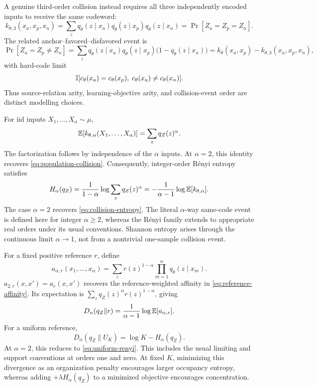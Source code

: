 A genuine third-order collision instead requires all three independently encoded inputs to receive the same codeword:
\begin{equation}
k_{\theta,3}(x_a,x_p,x_n)
=
\sum_z q_\theta(z\mid x_a)q_\theta(z\mid x_p)q_\theta(z\mid x_n)
=
\Pr[Z_a=Z_p=Z_n].
\end{equation}
The related anchor--favored--disfavored event is
\begin{equation}
\Pr[Z_a=Z_p\ne Z_n]
=
\sum_z q_\theta(z\mid x_a)q_\theta(z\mid x_p)
\bigl(1-q_\theta(z\mid x_n)\bigr)
=
k_\theta(x_a,x_p)-k_{\theta,3}(x_a,x_p,x_n),
\end{equation}
with hard-code limit
\[
\mathbb{I}[c_\theta(x_a)=c_\theta(x_p),\;c_\theta(x_a)\ne c_\theta(x_n)].
\]
Thus source-relation arity, learning-objective arity, and collision-event order are distinct modelling choices.

For iid inputs $X_1,\ldots,X_\alpha\sim\mu$,
\begin{equation}
\mathbb{E}[k_{\theta,\alpha}(X_1,\ldots,X_\alpha)]
=\sum_zq_Z(z)^\alpha.
\label{eq:higher-order-population-collision}
\end{equation}
The factorization follows by independence of the $\alpha$ inputs.
At $\alpha=2$, this identity recovers \cref{eq:population-collision}.
Consequently, integer-order R\'enyi entropy~\citep{renyi1961measures} satisfies
\begin{equation}
H_\alpha(q_Z)
=\frac1{1-\alpha}\log\sum_zq_Z(z)^\alpha
=-\frac1{\alpha-1}\log\mathbb{E}[k_{\theta,\alpha}].
\label{eq:renyi-alpha-collision}
\end{equation}
The case $\alpha=2$ recovers \cref{eq:collision-entropy}.
The literal $\alpha$-way same-code event is defined here for integer $\alpha\ge2$, whereas the R\'enyi family extends to appropriate real orders under its usual conventions.
Shannon entropy arises through the continuous limit $\alpha\to1$, not from a nontrivial one-sample collision event.

For a fixed positive reference $r$, define
\begin{equation}
a_{\alpha,r}(x_1,\ldots,x_\alpha)
=\sum_zr(z)^{1-\alpha}\prod_{m=1}^{\alpha}q_\theta(z\mid x_m).
\end{equation}
$a_{2,r}(x,x')=a_r(x,x')$ recovers the reference-weighted affinity in \cref{eq:reference-affinity}.
Its expectation is $\sum_zq_Z(z)^\alpha r(z)^{1-\alpha}$, giving
\begin{equation}
D_\alpha(q_Z\|r)
=\frac1{\alpha-1}\log\mathbb{E}[a_{\alpha,r}].
\label{eq:renyi-alpha-reference-affinity}
\end{equation}
For a uniform reference,
\begin{equation}
D_\alpha(q_Z\|U_K)=\log K-H_\alpha(q_Z).
\label{eq:uniform-renyi-alpha}
\end{equation}
At $\alpha=2$, this reduces to \cref{eq:uniform-renyi}.
This includes the usual limiting and support conventions at orders one and zero.
At fixed $K$, minimizing this divergence as an organization penalty encourages larger occupancy entropy, whereas adding $+\lambda H_\alpha(q_Z)$ to a minimized objective encourages concentration.

